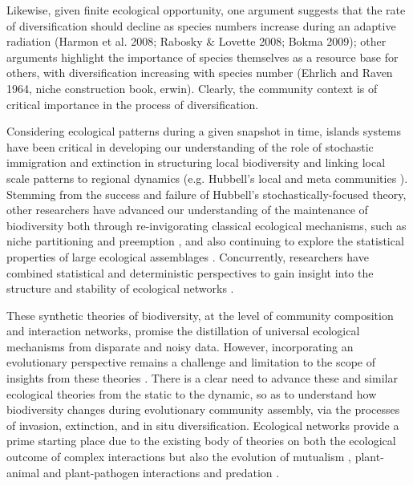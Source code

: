 \documentclass[12pt]{article}
\begin{document}
Likewise, given finite ecological opportunity, one argument suggests
that the rate of diversification should decline as species numbers
increase during an adaptive radiation (Harmon et al. 2008; Rabosky \&
Lovette 2008; Bokma 2009); other arguments highlight the importance of
species themselves as a resource base for others, with diversification
increasing with species number (Ehrlich and Raven 1964, niche
construction book, erwin). Clearly, the community context is of
critical importance in the process of diversification.

Considering ecological patterns during a given snapshot in time,
islands systems have been critical in developing our understanding of
the role of stochastic immigration and extinction in structuring local
biodiversity and linking local scale patterns to regional dynamics
(e.g. Hubbell's local and meta communities
\citep{hubbell2001}). Stemming from the success and failure of
Hubbell's stochastically-focused theory, other researchers have
advanced our understanding of the maintenance of biodiversity both
through re-invigorating classical ecological mechanisms, such as niche
partitioning and preemption \citep{chessonAndThem, fukami}, and also
continuing to explore the statistical properties of large ecological
assemblages \citep{ettinneCrew, conlisk, mcgill,
  harte2011}. Concurrently, researchers have combined statistical and
deterministic perspectives to gain insight into the structure and
stability of ecological networks \citep{williams2000, brose2006,
  berlow2009, romanuk2009, harte2011}.

These synthetic theories of biodiversity, at the level of community
composition and interaction networks, promise the distillation of
universal ecological mechanisms from disparate and noisy
data. However, incorporating an evolutionary perspective remains a
challenge and limitation to the scope of insights from these theories
\citep{ricklefs1987, qian2005}.  There is a clear need to advance
these and similar ecological theories from the static to the dynamic,
so as to understand how biodiversity changes during evolutionary
community assembly, via the processes of invasion, extinction, and in
situ diversification. Ecological networks provide a prime starting
place due to the existing body of theories on both the ecological
outcome of complex interactions \citep{williams2000, brose2006} but
also the evolution of mutualism \citep{thompson, others}, plant-animal
and plant-pathogen interactions \citep{jansen, blackRiver, thompson,
  XXXX} and predation \citep{XXXX}.
\end{document}
